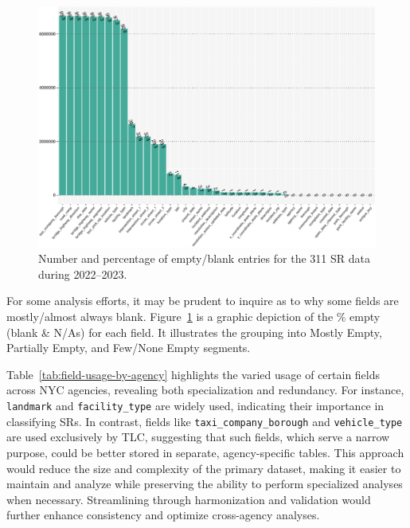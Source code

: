 \documentclass[linenumber]{jdsart}
\begin{document}
\begin{figure}[tbp]
	\centering
  	\includegraphics[width=\textwidth]{BlankFields.pdf}
	\caption{Number and percentage of empty/blank entries for the
          311 SR data during 2022--2023.}
	\label{fig:blank_fields}
\end{figure}

For some analysis efforts, it may be prudent to inquire 
as to why some fields are mostly/almost always blank. 
Figure~\ref{fig:blank_fields} is a graphic depiction of the \%
empty (blank \& N/As) for each field. It illustrates the grouping into 
Mostly Empty, Partially Empty, and Few/None Empty segments. 


Table~\ref{tab:field-usage-by-agency} highlights the varied usage of
certain fields across NYC agencies, revealing both specialization and
redundancy. For instance, \texttt{landmark} and
\texttt{facility\_type} are widely used, indicating their importance
in classifying SRs. In contrast, fields like
\texttt{taxi\_company\_borough} and \texttt{vehicle\_type} are used
exclusively by TLC, suggesting that such fields, which serve a narrow
purpose, could be better stored in separate, agency-specific tables.
This approach would reduce the size and complexity of the primary
dataset, making it easier to maintain and analyze while preserving
the ability to perform specialized analyses when necessary.
Streamlining through harmonization and validation would further
enhance consistency and optimize cross-agency analyses.
\end{document}

